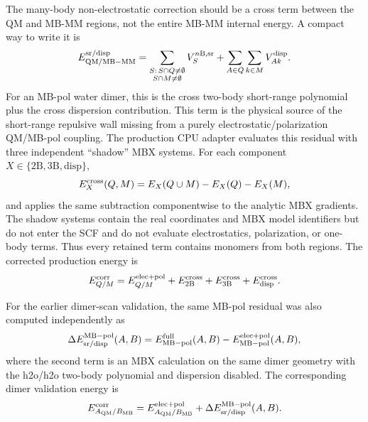 \documentclass[11pt]{article}
\begin{document}
The many-body non-electrostatic correction should be a cross term between
the QM and MB-MM regions, not the entire MB-MM internal energy. A compact
way to write it is
\begin{equation}
  E_{\rm QM/MB-MM}^{\rm sr/disp}
  =
  \sum_{\substack{S:\,S\cap Q\ne\emptyset\\S\cap M\ne\emptyset}}
  V_S^{n{\rm B},{\rm sr}}
  +
  \sum_{A\in Q}\sum_{k\in M}V_{Ak}^{\rm disp}.
  \label{eq:qmmm_cross_sr_disp}
\end{equation}
For an MB-pol water dimer, this is the cross two-body short-range
polynomial plus the cross dispersion contribution. This term is the
physical source of the short-range repulsive wall missing from a purely
electrostatic/polarization QM/MB-pol coupling.
The production CPU adapter evaluates this residual with three independent
``shadow'' MBX systems. For each component
$X\in\{2\mathrm{B},3\mathrm{B},\mathrm{disp}\}$,
\begin{equation}
  E_X^{\rm cross}(Q,M)
  = E_X(Q\cup M)-E_X(Q)-E_X(M),
  \label{eq:shadow_cross_residual}
\end{equation}
and applies the same subtraction componentwise to the analytic MBX
gradients. The shadow systems contain the real coordinates and MBX model
identifiers but do not enter the SCF and do not evaluate electrostatics,
polarization, or one-body terms. Thus every retained term contains
monomers from both regions. The corrected production energy is
\begin{equation}
  E_{Q/M}^{\rm corr}
  = E_{Q/M}^{\rm elec+pol}
  + E_{2\rm B}^{\rm cross}+E_{3\rm B}^{\rm cross}
  + E_{\rm disp}^{\rm cross}.
  \label{eq:corrected_hybrid_production}
\end{equation}

For the earlier dimer-scan validation, the same MB-pol residual was also
computed independently as
\begin{equation}
  \Delta E_{\rm sr/disp}^{\rm MB-pol}(A,B)
  =
  E_{\rm MB-pol}^{\rm full}(A,B)
  -
  E_{\rm MB-pol}^{\rm elec+pol}(A,B),
  \label{eq:mbpol_sr_disp_residual}
\end{equation}
where the second term is an MBX calculation on the same dimer geometry with
the h2o/h2o two-body polynomial and dispersion disabled. The corresponding
dimer validation energy is
\begin{equation}
  E_{A_{\rm QM}/B_{\rm MB}}^{\rm corr}
  =
  E_{A_{\rm QM}/B_{\rm MB}}^{\rm elec+pol}
  +
  \Delta E_{\rm sr/disp}^{\rm MB-pol}(A,B).
  \label{eq:corrected_hybrid_validation}
\end{equation}
\end{document}
